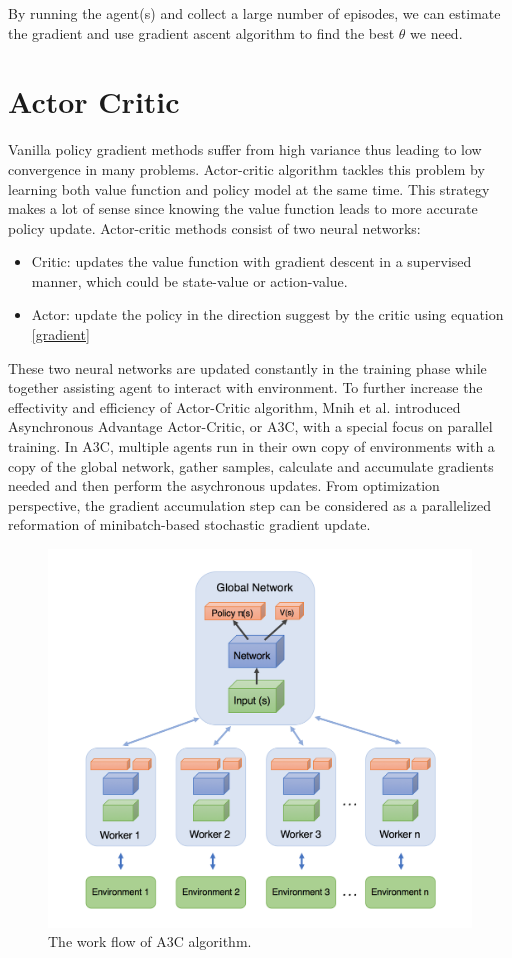 By running the agent(s) and collect a large number of episodes, we can estimate the gradient and use gradient ascent algorithm to find the best $\theta$ we need.

\section{Actor Critic}

Vanilla policy gradient methods suffer from high variance thus leading to low convergence in many problems. Actor-critic algorithm tackles this problem by learning both value function and policy model at the same time. This strategy makes a lot of sense since knowing the value function leads to more accurate policy update. Actor-critic methods consist of two neural networks:

\begin{itemize}
\item Critic: updates the value function with gradient descent in a supervised manner, which could be state-value or action-value.
\item Actor: update the policy in the direction suggest by the critic using equation \ref{gradient}
\end{itemize}

These two neural networks are updated constantly in the training phase while together assisting agent to interact with environment. To further increase the effectivity and efficiency of Actor-Critic algorithm, Mnih et al. \cite{mnih} introduced Asynchronous Advantage Actor-Critic, or A3C, with a special focus on parallel training. In A3C, multiple agents run in their own copy of environments with a copy of the global network, gather samples, calculate and accumulate gradients needed and then perform the asychronous updates. From optimization perspective, the gradient accumulation step can be considered as a parallelized reformation of minibatch-based stochastic gradient update. 

\begin{figure}
\centering
\includegraphics[scale=0.2]{charts/a3c.png}
\caption{The work flow of A3C algorithm.}
\end{figure}

